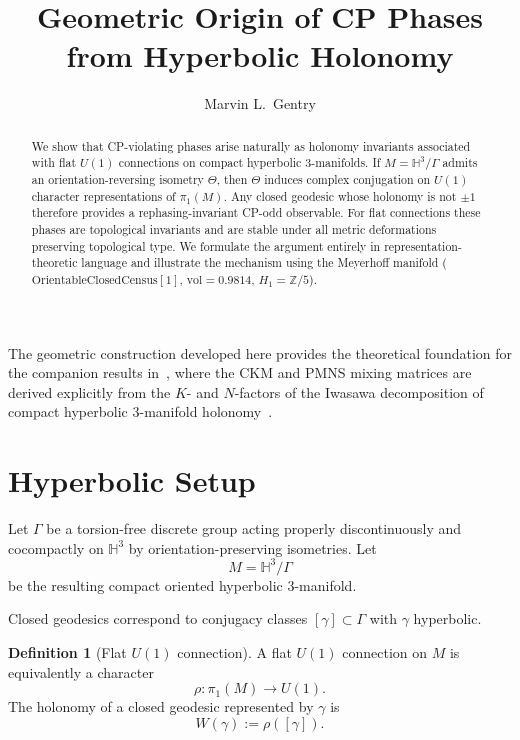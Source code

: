\documentclass[12pt]{article}
\title{Geometric Origin of CP Phases from Hyperbolic Holonomy}
\author[1]{Marvin L.\ Gentry}
\affil[1]{Independent Researcher\\
  \texttt{drmlgentry@protonmail.com}\\
  ORCID: 0009-0006-4550-2663}
\date{}
\theoremstyle{definition}
\newtheorem{definition}[theorem]{Definition}
\theoremstyle{remark}
\begin{document}
\maketitle

\begin{abstract}
We show that CP-violating phases arise naturally as holonomy invariants
associated with flat $U(1)$ connections on compact hyperbolic $3$-manifolds.
If $M = \mathbb{H}^3/\Gamma$ admits an orientation-reversing isometry $\Theta$,
then $\Theta$ induces complex conjugation on $U(1)$ character representations
of $\pi_1(M)$. Any closed geodesic whose holonomy is not $\pm 1$
therefore provides a rephasing-invariant CP-odd observable.
For flat connections these phases are topological invariants and
are stable under all metric deformations preserving topological type.
We formulate the argument entirely in representation-theoretic language
and illustrate the mechanism using the Meyerhoff manifold ($\mathrm{OrientableClosedCensus}[1]$, $\mathrm{vol}=0.9814$, $H_1=\mathbb{Z}/5$).
\end{abstract}

The geometric construction developed here provides the theoretical
foundation for the companion results in~\cite{Gentry:CKM,Gentry:PMNS},
where the CKM and PMNS mixing matrices are derived explicitly from the
$K$- and $N$-factors of the Iwasawa decomposition of compact hyperbolic
3-manifold holonomy~\cite{Gentry:CKM,Gentry:PMNS}.

\section{Hyperbolic Setup}

Let $\Gamma$ be a torsion-free discrete group acting properly discontinuously
and cocompactly on $\mathbb{H}^3$ by orientation-preserving isometries.
Let
\[
M = \mathbb{H}^3/\Gamma
\]
be the resulting compact oriented hyperbolic $3$-manifold.

Closed geodesics correspond to conjugacy classes
$[\gamma] \subset \Gamma$ with $\gamma$ hyperbolic.

\begin{definition}[Flat $U(1)$ connection]
A flat $U(1)$ connection on $M$ is equivalently a character
\[
\rho : \pi_1(M) \longrightarrow U(1).
\]
The holonomy of a closed geodesic represented by $\gamma$
is
\[
W(\gamma) := \rho([\gamma]).
\]
\end{definition}
\end{document}
